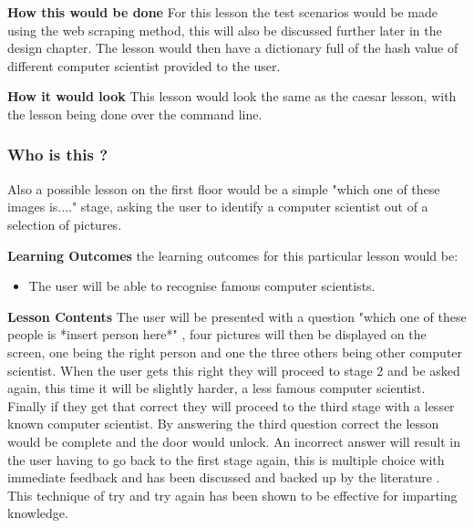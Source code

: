 \documentclass[12pt,a4paper]{article}
\begin{document}
\textbf{How this would be done} 
\newline For this lesson the test scenarios would be made using the web scraping method, this will also be discussed further later in the design chapter. The lesson would then have a dictionary full of the hash value of different computer scientist provided to the user.  

\textbf{How it would look} 
This lesson would look the same as the caesar lesson, with the lesson being done over the command line.
 

\subsubsection{Who is this ?}

Also a possible lesson on the first floor would be a simple "which one of these images is...." stage, asking the user to identify a computer scientist out of a selection of pictures.  

\textbf{Learning Outcomes} 
\newline the learning outcomes for this particular lesson would be:  

\begin{itemize}\itemsep0pt
	\item The user will be able to recognise famous computer scientists.
\end{itemize} 

\textbf{Lesson Contents} 
\newline The user will be presented with a question "which one of these people is *insert person here*" , four pictures will then be displayed on the screen, one being the right person and one the three others being other computer scientist. When the user gets this right they will proceed to stage 2 and be asked again, this time it will be slightly harder, a less famous computer scientist. Finally if they get that correct they will proceed to the third stage with a lesser known computer scientist. By answering the third question correct the lesson would be complete and the door would unlock. An incorrect answer will result in the user having to go back to the first stage again, this is multiple choice with immediate feedback and has been discussed and backed up by the literature \cite{roediger2011critical}. This technique of try and try again has been shown to be effective for imparting knowledge. 
\end{document}
